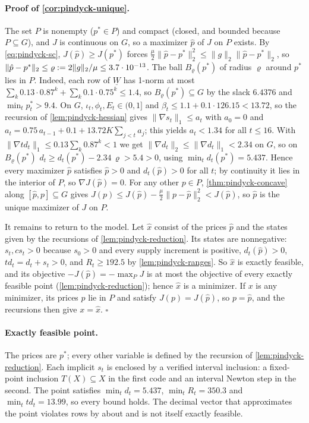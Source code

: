 \paragraph{Proof of \cref{cor:pindyck-unique}.}
The set $P$ is nonempty ($p^*\in P$) and compact (closed, and bounded because $P\subseteq G$), and $J$ is continuous on $G$, so a maximizer $\hat p$ of $J$ on $P$ exists.
By \eqref{eq:pindyck-sc}, $J(\hat p)\ge J(p^*)$ forces $\tfrac{\mu}{2}\|\hat p-p^*\|_2^2\le\|g\|_2\|\hat p-p^*\|_2$, so $\|\hat p-p^*\|_2\le\varrho:=2\|g\|_2/\mu\le3.7\cdot 10^{-13}$.
The ball $B_\varrho(p^*)$ of radius $\varrho$ around $p^*$ lies in $P$.
Indeed, each row of $\underline W$ has 1-norm at most $\sum_k0.13\cdot0.87^k+\sum_k0.1\cdot0.75^k\le1.4$, so $B_\varrho(p^*)\subseteq G$ by the slack $6.4376$ and $\min_tp^*_t>9.4$.
On $G$, $\iota_t,\phi_t,E_t\in(0,1]$ and $\beta_t\le1.1+0.1\cdot126.15<13.72$, so the recursion of \cref{lem:pindyck-hessian} gives
$\|\nabla s_t\|_1\le a_t$ with $a_0=0$ and $a_t=0.75\,a_{t-1}+0.1+13.72K\sum_{j<t}a_j$; this yields $a_t<1.34$ for all $t\le16$.
With $\|\nabla td_t\|_1\le0.13\sum_k0.87^k<1$ we get $\|\nabla d_t\|_2\le\|\nabla d_t\|_1<2.34$ on $G$, so on $B_\varrho(p^*)$
$d_t\ge d_t(p^*)-2.34\,\varrho>5.4>0$, using $\min_td_t(p^*)=5.437$.
Hence every maximizer $\hat p$ satisfies $\hat p>0$ and $d_t(\hat p)>0$ for all $t$; by continuity it lies in the interior of $P$, so $\nabla J(\hat p)=0$.
For any other $p\in P$, \cref{thm:pindyck-concave} along $[\hat p,p]\subseteq G$ gives $J(p)\le J(\hat p)-\tfrac{\mu}{2}\|p-\hat p\|_2^2<J(\hat p)$, so $\hat p$ is the unique maximizer of $J$ on $P$.

It remains to return to the model.
Let $\hat x$ consist of the prices $\hat p$ and the states given by the recursions of \cref{lem:pindyck-reduction}.
Its states are nonnegative: $s_t,cs_t>0$ because $s_0>0$ and every supply increment is positive, $d_t(\hat p)>0$, $td_t=d_t+s_t>0$, and $R_t\ge192.5$ by \cref{lem:pindyck-ranges}.
So $\hat x$ is exactly feasible, and its objective $-J(\hat p)=-\max_PJ$ is at most the objective of every exactly feasible point (\cref{lem:pindyck-reduction}); hence $\hat x$ is a minimizer.
If $x$ is any minimizer, its prices $p$ lie in $P$ and satisfy $J(p)=J(\hat p)$, so $p=\hat p$, and the recursions then give $x=\hat x$.
\hfill$\square$

\paragraph{Exactly feasible point.}
The prices are $p^*$; every other variable is defined by the recursion of \cref{lem:pindyck-reduction}.
Each implicit $s_t$ is enclosed by a verified interval inclusion: a fixed-point inclusion $T(X)\subseteq X$ in the first code and an interval Newton step in the second.
The point satisfies $\min_td_t=5.437$, $\min_tR_t=350.3$ and $\min_ttd_t=13.99$, so every bound holds.
The decimal vector that approximates the point violates rows by about  and is not itself exactly feasible.

